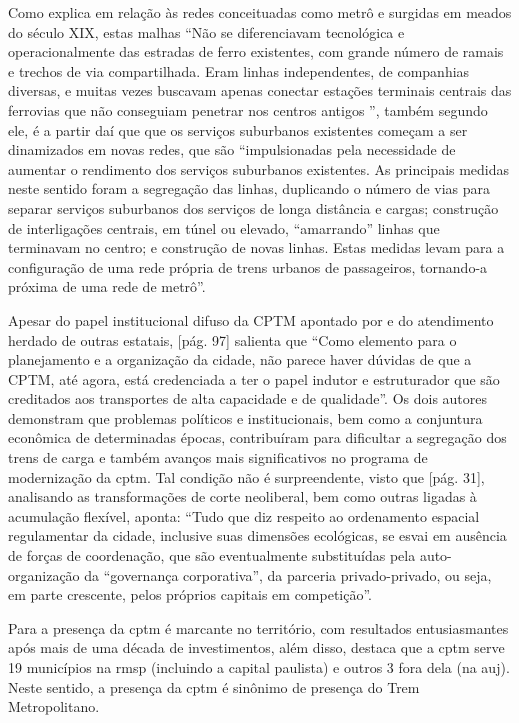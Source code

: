 	Como explica  em relação às redes conceituadas como metrô e surgidas em meados do século XIX, estas malhas ``Não se diferenciavam tecnológica e operacionalmente das estradas de ferro  existentes,  com  grande  número  de  ramais  e  trechos  de  via compartilhada. Eram linhas independentes, de companhias diversas, e muitas  vezes  buscavam  apenas  conectar  estações  terminais  centrais das ferrovias que não conseguiam penetrar nos centros antigos '', também segundo ele, é a partir daí que que os serviços suburbanos existentes começam a ser dinamizados em novas redes, que são ``impulsionadas  pela  necessidade  de  aumentar  o  rendimento  dos serviços  suburbanos  existentes.  As  principais  medidas  neste  sentido foram  a  segregação  das  linhas,  duplicando  o  número  de  vias  para separar serviços suburbanos dos serviços de longa distância e  cargas; construção  de  interligações  centrais,  em  túnel  ou  elevado, “amarrando” linhas que terminavam no centro; e construção de novas linhas. Estas medidas levam para a configuração de uma rede própria de trens urbanos de passageiros, tornando-a próxima de uma rede de metrô''\cite[pág. 32]{Isoda}.
	
	Apesar do papel institucional difuso da CPTM apontado por  e do atendimento herdado de outras estatais, [pág. 97] salienta que ``Como elemento para o planejamento e a organização da cidade, não parece haver dúvidas de que a CPTM, até agora, está credenciada a ter o papel indutor e estruturador que são creditados aos transportes de alta capacidade e de qualidade''. Os dois autores demonstram que problemas políticos e institucionais, bem como a conjuntura econômica de determinadas épocas, contribuíram para dificultar a segregação dos trens de carga e também avanços mais significativos no programa de modernização da \gls{cptm}. Tal condição não é surpreendente, visto que [pág. 31], analisando as transformações de corte neoliberal, bem como outras ligadas à acumulação flexível, aponta: ``Tudo que diz respeito ao ordenamento	espacial regulamentar da cidade, inclusive suas dimensões ecológicas, se esvai em ausência	de forças de coordenação, que são eventualmente substituídas pela auto-organização da “governança corporativa”, da parceria privado-privado, ou seja, em parte crescente, pelos próprios capitais em competição''.
	
	Para  a presença da \gls{cptm} é marcante no território, com resultados entusiasmantes após mais de uma década de investimentos, além disso, destaca que a \gls{cptm} serve 19 municípios na \gls{rmsp} (incluindo a capital paulista) e outros 3 fora dela (na \gls{auj}). Neste sentido, a presença da \gls{cptm} é sinônimo de presença do Trem Metropolitano.
	
